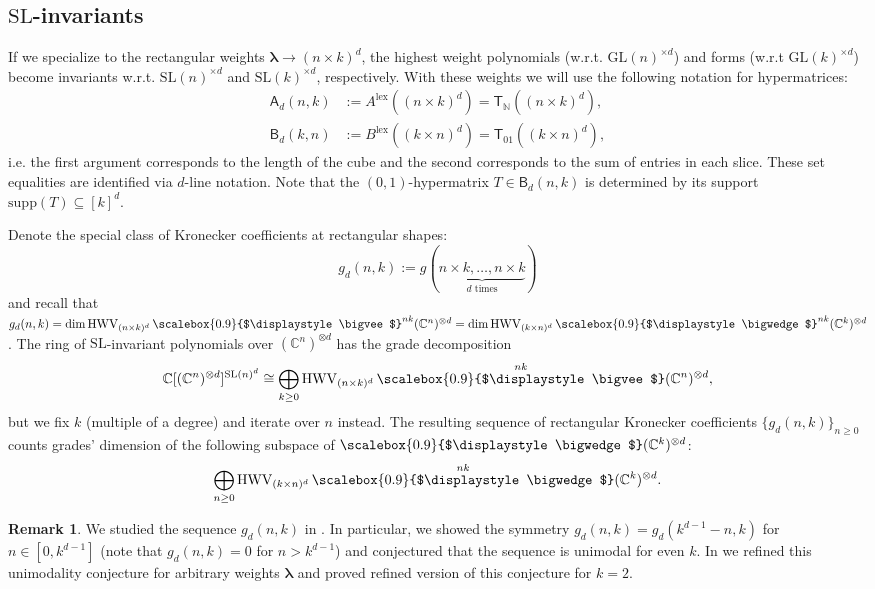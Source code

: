 \documentclass[12pt, reqno]{amsart}
\theoremstyle{definition}
\newtheorem{remark}{Remark}[section]
\newcommand{\lex}{\mathrm{lex}}
\let\oldbigwedge\bigwedge
\let\oldbigvee\bigvee
\renewcommand{\bigwedge}{
  \mathop{
    \vcenter{
      \hbox{\scalebox{0.9}{$\displaystyle\oldbigwedge$}}
    }
  }
}
\renewcommand{\bigvee}{
  \mathop{
    \vcenter{
      \hbox{\scalebox{0.9}{$\displaystyle\oldbigvee$}}
    }
  }
}
\begin{document}
\subsection{$\mathrm{SL}$-invariants} 
If we specialize to the rectangular weights $\pmb{\lambda} \to (n \times k)^d$, the highest weight polynomials (w.r.t. $\mathrm{GL}(n)^{\times d}$) and forms (w.r.t $\mathrm{GL}(k)^{\times d}$) become invariants w.r.t. $\mathrm{SL}(n)^{\times d}$ and $\mathrm{SL}(k)^{\times d}$, respectively. With these weights we will use the following notation for hypermatrices:
\begin{align*}
    \mathsf{A}_d(n,k) &:= A^{\lex}((n \times k)^d) = \mathsf{T}_{\mathbb{N}}((n \times k)^d),\\
    \mathsf{B}_d(k,n) &:= B^{\lex}((k \times n)^d) = \mathsf{T}_{01}((k \times n)^d),
\end{align*}
i.e. the first argument corresponds to the length of the cube and the second corresponds to the sum of entries in each slice.
These set equalities are identified via $d$-line notation. Note that the $(0,1)$-hypermatrix $T \in \mathsf{B}_d(n,k)$ is determined by its support $\mathrm{supp}(T) \subseteq [k]^d$.

Denote the special class of Kronecker coefficients at rectangular shapes:
$$
    g_d(n, k) := g(\underbrace{n\times k,\ldots, n \times k}_{d\text{ times}})
$$
and recall that $g_d(n,k) = \dim \mathrm{HWV}_{(n \times k)^d}\bigvee^{nk} (\mathbb{C}^n)^{\otimes d} = \dim \mathrm{HWV}_{(k \times n)^d}\bigwedge^{nk} (\mathbb{C}^k)^{\otimes d}$. 
%
The ring of $\mathrm{SL}$-invariant polynomials over $(\mathbb{C}^n)^{\otimes d}$ has the grade decomposition
$$
    \mathbb{C}[(\mathbb{C}^n)^{\otimes d}]^{\mathrm{SL}(n)^d}
    \cong
    \bigoplus_{k \ge 0} \mathrm{HWV}_{(n \times k)^d} \bigvee^{nk} (\mathbb{C}^n)^{\otimes d},
$$
but we fix $k$ (multiple of a degree) and iterate over $n$ instead. The resulting sequence of rectangular Kronecker coefficients $\{g_d(n,k)\}_{n \ge 0}$ counts grades' dimension of the following subspace of $\bigwedge (\mathbb{C}^k)^{\otimes d}$:
$$
    \bigoplus_{n \ge 0} \mathrm{HWV}_{(k \times n)^d} \bigwedge^{nk} (\mathbb{C}^k)^{\otimes d}.
$$
\begin{remark}
    We studied the sequence $g_d(n,k)$ in \cite{ayfund}. In particular, we showed the symmetry $g_d(n,k) = g_d(k^{d-1}-n, k)$ for $n \in [0,k^{d-1}]$ (note that $g_d(n,k) = 0$ for $n > k^{d-1}$) and conjectured that the sequence is unimodal for even $k$. In \cite{ayuni} we refined this unimodality conjecture for arbitrary weights $\pmb{\lambda}$ and proved refined version of this conjecture for $k = 2$.
\end{remark}
\end{document}
